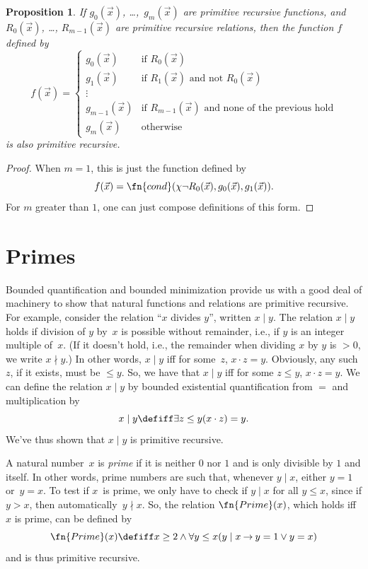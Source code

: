 \documentclass[10pt,a4paper]{article}
\theoremstyle{plain}
\newtheorem{prop}[thm]{Proposition}
\theoremstyle{definition}
\theoremstyle{remark}
\newcommand*{\olfileid}[3]{}
\newcommand*{\olsection}[1]{\section*{#1}}
\providecommand{\lif}{\mathbin{\rightarrow}}
\providecommand{\Char}{\chi}
\providecommand{\bforall}{\forall}
\providecommand{\bexists}{\exists}
\begin{document}
\begin{prop}
If $g_0(\vec x)$, \dots,~$g_m(\vec x)$ are primitive recursive functions, and $R_0(\vec
x)$, \dots, $R_{m-1}(\vec x)$ are primitive recursive relations, then
the function $f$ defined by
\[
f(\vec x) = \begin{cases}
    g_0(\vec x) & \text{if $R_0(\vec{x})$} \\
    g_1(\vec x) & \text{if $R_1(\vec{x})$ and not $R_0(\vec{x})$} \\
    \vdots & \\
    g_{m-1}(\vec x) & \text{if $R_{m-1}(\vec{x})$ and none of the
      previous hold}
    \\
    g_m(\vec x) & \mbox{otherwise}
\end{cases}
\]
is also primitive recursive.
\end{prop}

\begin{proof}
  When $m = 1$, this is just the function defined by
  \[
  f(\vec x) = \fn{cond}(\Char{\lnot R_0}(\vec x),g_0(\vec x),g_1(\vec
  x)).
  \]
  For $m$ greater than $1$, one can just compose definitions of this
  form.
\end{proof}




\olfileid{cmp}{rec}{pri}
\olsection{Primes}

Bounded quantification and bounded minimization provide us with a good
deal of machinery to show that natural functions and relations are
primitive recursive. For example, consider the relation ``$x$
divides $y$'', written $x \mid y$.  The relation $x \mid y$ holds if
division of $y$ by~$x$ is possible without remainder, i.e., if $y$ is
an integer multiple of~$x$.  (If it doesn't hold, i.e., the remainder
when dividing $x$ by $y$ is $> 0$, we write $x \nmid y$.) In other
words, $x \mid y$ iff for some~$z$, $x \cdot z = y$.  Obviously, any
such $z$, if it exists, must be $\leq y$. So, we have that $x \mid y$
iff for some $z \le y$, $x \cdot z = y$.  We can define the relation
$x \mid y$ by bounded existential quantification from $=$ and
multiplication by
\[
x \mid y \defiff \bexists{z \leq y}{(x \cdot z) = y}.
\]
We've thus shown that $x \mid y$ is primitive recursive.

A natural number~$x$ is \emph{prime} if it is neither $0$ nor $1$ and
is only divisible by $1$ and itself. In other words, prime numbers are
such that, whenever $y \mid x$, either $y = 1$ or~$y=x$.  To test if
$x$~is prime, we only have to check if $y \mid x$ for all $y \le x$,
since if $y > x$, then automatically~$y \nmid x$.  So, the relation
$\fn{Prime}(x)$, which holds iff $x$ is prime, can be defined by
\[
\fn{Prime}(x) \defiff x \geq 2 \land \bforall{y \leq x}{(y \mid x \lif y
  = 1 \lor y = x)}
\]
and is thus primitive recursive.
\end{document}
